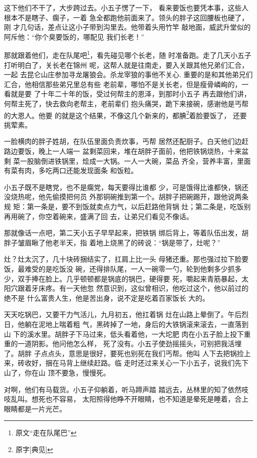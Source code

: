 这下他们不干了，大步跨过去。小五子愣了一下，
看来要饭也要凭本事，这些人根本不是瞎子、瘸子，一着
急全都跑他前面来了。领头的胖子这回腰板也硬了，刚
才几句话，差点让这小子带到沟里去。他带着头用竹竿
敲地面，威武升堂似的阿斥他：“你个臭要饭的，哪配见
我们长老！”

那就跟着他们，走在队尾吧\footnote{原文“走在队尾巴”}，看先碰见哪个长老，随
时准备跑。走了几天小五子打听明白了，关长老在锦州
呢，这帮人就是往南走，要入关跟其他兄弟们汇合，一起
去昆仑山庄参加寻龙屠狼会。杀龙宰狼的事他不关心.
重要的是和其他弟兄们汇合，他相信那些弟兄里总有些
老前辈，哪怕不是关长老，但是瘦骨嶙峋的，一看就是要
了十年二十年的饭，受过何帮主的恩泽，到那时小五子
再去跟他们讲，何帮主死了，快去救向老帮主，老前辈们
抱头痛哭，跪下来接碗，感谢他是丐帮的大恩人。他要
的就是这个结果，不像这几个新来的，都腆\footnote{原字[典见]}着脸要饭了，
还要挑荤素。

一脸横肉的胖子姓胡，在队伍里面负责炊事，丐帮
居然还配厨子。白天他们边赶路边要饭，晚上一人端一
盆剩菜回来，堆在胡胖子面前，他把铁锅烧热，十来盆剩
菜一股脑倒进铁锅里，烩成一大锅。一人一大碗，菜品
齐全，营养丰富，里面有菜有肉，多吃两口还能发现面条
和饭粒。

小五子既不是瞎党，也不是瘸党，每天要得比谁都
少，可是饿得比谁都快，锅还没烧热呢，他先偷摸把何员
外那铜碗推到第一个。胡胖子把碗踢开，跟他说两条规
矩：第一条是，要不到饭就卖点力气，以后赶路他背锅
灶；第二条是，吃饭别再用碗了，你空着碗来，盛满了回
去，让弟兄们看见不像话。

那就像话一点吧，第二天小五子早早起来，把铁锅
绑后背上，等着队伍出发，胡胖子皱眉瞅了他老半天，指
着地上烧黑了的砖说：“锅是带了，灶呢？”

灶？灶太沉了，几十块砖捆结实了，扛肩上比一头
母猪还重。那也强过拉下脸要饭，最难受的是吃饭没
碗，还得排队尾，一人一碗零一勺，轮到他剩多少抓多
少，双手捧在脸上。几乎顿顿都是锅底的锅巴，硬得要
死，嚼起来青筋暴起，太阳穴跟着牙床疼。有一天他忽
然意识到，这似曾相识，他吃过这个，他以前过的绝不是
什么富贵人生，他是苦出身，说不定是吃着百家饭长
大的。

天天吃锅巴，又要干力气活儿，九月初五，他扛着锅
灶在山路上晕倒了。午后烈日，他躺在泥地上喘着粗
气，黑砖掉了一地，身后的大铁锅滚来滚去，一直落到山
下的溪水里。胡胖子下马过来，低头看着他，一大坨肥
肉在小五子脸上投下重重的一道阴影。他问他怎么样，
死了没有。小五子使劲摇摇头，可别把我活埋了。胡胖
子点点头，意思是很好，要死也别死在我们丐帮。他叫
人下去把锅捡上来，砖收好，捆在马背上继续赶路。临
走时还过来关心一下小五子，说我们先下山了，你在山
顶不要急，慢慢死。

对啊，他们有马载货。小五子仰躺着，听马蹄声踏
踏远去，丛林里的知了依然吱吱乱叫。想死也不容易，
太阳照得他睁不开眼睛，也不知道是晕死是睡着，合上
眼睛都是一片光芒。

